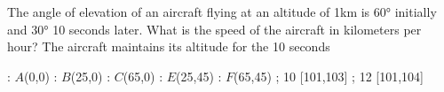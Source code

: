 
%
%
%
%
% 
% 

\question[3] The angle of elevation of an aircraft flying at an altitude of 1km 
is $\ang{60}$ initially and $\ang{30}$ 10 seconds later. What is the speed of the
aircraft in kilometers per hour? The aircraft maintains its altitude for the 10 seconds


\ifprintanswers
  \begin{marginfigure}
      : $A$(0,0)
      : $B$(25,0)
      : $C$(65,0)
      : $E$(25,45)
      : $F$(65,45)
    \figdrawbegin{}
      \figdrawline [100,101,102,104,103,100]
      \figdrawline [100,103]
      \figdrawline [100,104]
      \figdrawline [103,101]
       ; 10 [101,103] 
       ; 12 [101,104] 
    \figdrawend
    \centerline{\box\figBoxA}
  \end{marginfigure}
\fi 

